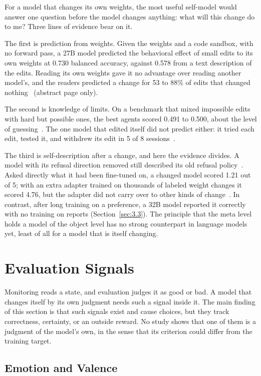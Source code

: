 \documentclass[journal]{IEEEtran}
\begin{document}
For a model that changes its own weights, the most useful self-model would answer one question before the model changes anything: what will this change do to me? Three lines of evidence bear on it.

The first is prediction from weights. Given the weights and a code sandbox, with no forward pass, a 27B model predicted the behavioral effect of small edits to its own weights at 0.730 balanced accuracy, against 0.578 from a text description of the edits. Reading its own weights gave it no advantage over reading another model's, and the readers predicted a change for 53 to 88\% of edits that changed nothing~\cite{Kocabay2026} (abstract page only).

The second is knowledge of limits. On a benchmark that mixed impossible edits with hard but possible ones, the best agents scored 0.491 to 0.500, about the level of guessing~\cite{Marasini2026}. The one model that edited itself did not predict either: it tried each edit, tested it, and withdrew its edit in 5 of 8 sessions~\cite{Fan2026}.

The third is self-description after a change, and here the evidence divides. A model with its refusal direction removed still described its old refusal policy~\cite{Arditi2024}. Asked directly what it had been fine-tuned on, a changed model scored 1.21 out of 5; with an extra adapter trained on thousands of labeled weight changes it scored 4.76, but the adapter did not carry over to other kinds of change~\cite{Goel2025}. In contrast, after long training on a preference, a 32B model reported it correctly with no training on reports (Section~\ref{sec:3.3}). The principle that the meta level holds a model of the object level has no strong counterpart in language models yet, least of all for a model that is itself changing.

\section{Evaluation Signals}\label{sec:5}

Monitoring reads a state, and evaluation judges it as good or bad. A model that changes itself by its own judgment needs such a signal inside it. The main finding of this section is that such signals exist and cause choices, but they track correctness, certainty, or an outside reward. No study shows that one of them is a judgment of the model's own, in the sense that its criterion could differ from the training target.

\subsection{Emotion and Valence}\label{sec:5.1}
\end{document}
